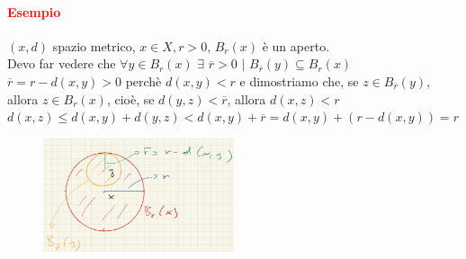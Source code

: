 \documentclass{article}
\begin{document}
\paragraph{\textcolor{red}{Esempio}}
$(x,d)$ spazio metrico, $x \in X, r>0$, $B_r(x)$ è un aperto.\\
Devo far vedere che $\forall y \in B_r(x)\,\, \exists\,\, \overline{r}>0\,\,|\,\,B_{\overline{r}}(y)\subseteq B_r(x)$\\
$\overline{r}=r-d(x,y)>0$ perchè $d(x,y)<r$ e dimostriamo che, se $z \in B_{\overline{r}}(y)$, allora $z\in B_r(x)$, cioè, se $d(y,z)< \overline{r}$, allora $d(x,z)<r$\\
$d(x,z)\leq d(x,y)+d(y,z)<d(x,y)+\overline{r}=d(x,y)+(r-d(x,y))=r$
\begin{figure}[h!]
    \centering
    \includegraphics[width=0.5\textwidth]{Screenshot from 2023-03-22 17-46-52.png}
\end{figure}
\end{document}
